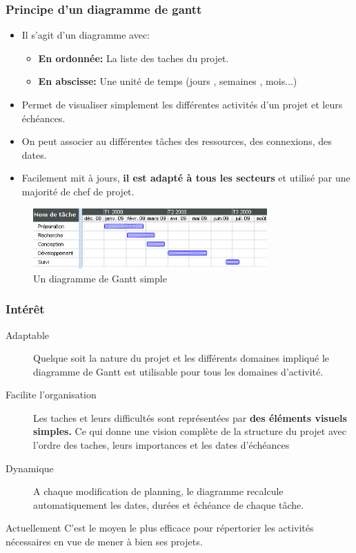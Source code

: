 \documentclass{beamer}
\begin{document}
\begin{frame}
  \frametitle{Principe d'un diagramme de gantt}
  \begin{itemize}
  \item Il s'agit d'un diagramme avec:
    \begin{itemize}
    \item \textbf{En ordonnée:} La liste des taches du projet.
    \item \textbf{En abscisse:} Une unité de temps (jours , semaines , mois...)
    \end{itemize}
  \item Permet de visualiser simplement les différentes activités d'un projet et leurs échéances.
  \item On peut associer au différentes tâches des ressources, des connexions, des dates.
  \item Facilement mit à jours, \textbf{il est adapté à tous les secteurs} et utilisé par une majorité de chef de projet.
  \end{itemize}
\end{frame}


\begin{frame}
  \begin{figure}
    \centering
    \includegraphics[width=0.8\textwidth]{Sgantt}
    \caption{Un diagramme de Gantt simple}
  \end{figure}
\end{frame}



\begin{frame}
  \frametitle{Intérêt}
  \begin{description}
  \item[Adaptable] \alert{Quelque soit la nature du projet} et les différents domaines impliqué \alert{le diagramme de Gantt est utilisable pour tous les domaines d'activité.}
  \item[Facilite l'organisation] Les taches et leurs difficultés sont représentées par \textbf{des éléments visuels simples.} Ce qui donne une vision complète de la structure du projet avec l'ordre des taches, leurs importances et les dates d'échéances
  \item[Dynamique] A chaque modification de planning, le diagramme \alert{recalcule automatiquement les dates, durées et échéance} de chaque tâche.
  \end{description}
  \begin{block} {Actuellement}
   C'est le moyen le plus efficace pour répertorier les activités nécessaires en vue de mener à bien ses projets.
  \end{block}
\end{frame}
\end{document}
